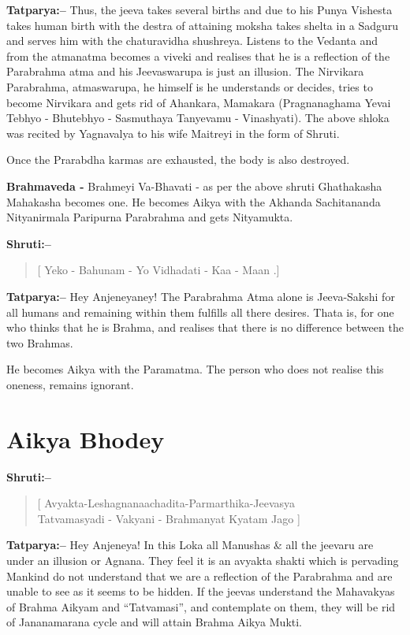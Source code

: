 \textbf{Tatparya:–} Thus, the jeeva takes several births and due to his Punya Vishesta takes human birth with the destra of attaining moksha takes shelta in a Sadguru and serves him with the chaturavidha shushreya. Listens to the Vedanta and from the atmanatma becomes a viveki and realises that he is a reflection of the Parabrahma atma and his Jeevaswarupa is just an illusion. The Nirvikara Parabrahma, atmaswarupa, he himself is he understands or decides, tries to become Nirvikara and gets rid of Ahankara, Mamakara (Pragnanaghama Yevai Tebhyo - Bhutebhyo - Sasmuthaya Tanyevamu - Vinashyati). The above shloka was recited by Yagnavalya to his wife Maitreyi in the form of Shruti.

Once the Prarabdha karmas are exhausted, the body is also destroyed.

\textbf{Brahmaveda -} Brahmeyi Va-Bhavati - as per the above shruti Ghathakasha Mahakasha becomes one. He becomes Aikya with the Akhanda Sachitananda Nityanirmala Paripurna Parabrahma and gets Nityamukta.

\textbf{Shruti:–}

\begin{verse}
[ Yeko - Bahunam - Yo Vidhadati - Kaa - Maan .]
\end{verse}

\textbf{Tatparya:–} Hey Anjeneyaney! The Parabrahma Atma alone is Jeeva-Sakshi for all humans and remaining within them fulfills all there desires. Thata is, for one who thinks that he is Brahma, and realises that there is no difference between the two Brahmas.

He becomes Aikya with the Paramatma. The person who does not realise this oneness, remains ignorant.

\chapter{Aikya Bhodey}

\textbf{Shruti:–}

\begin{verse}
[ Avyakta-Leshagnanaachadita-Parmarthika-Jeevasya \\ Tatvamasyadi - Vakyani - Brahmanyat Kyatam Jago ]
\end{verse}

\textbf{Tatparya:–} Hey Anjeneya! In this Loka all Manushas \& all the jeevaru are under an illusion or Agnana. They feel it is an avyakta shakti which is pervading Mankind do not understand that we are a reflection of the Parabrahma and are unable to see as it seems to be hidden. If the jeevas understand the Mahavakyas of Brahma Aikyam and “Tatvamasi”, and contemplate on them, they will be rid of Jananamarana cycle and will attain Brahma Aikya Mukti.

